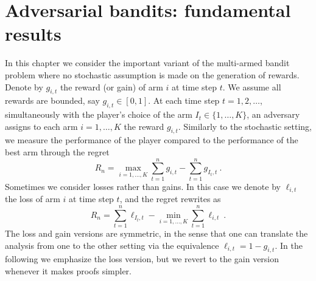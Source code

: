 \documentclass[11pt]{hackednow}
\begin{document}
\chapter{Adversarial bandits: fundamental results}
\label{adversarial}
In this chapter we consider the important variant of the multi-armed bandit problem where no stochastic assumption is made on the generation of rewards. Denote by $g_{i,t}$ the reward (or gain) of arm $i$ at time step $t$. We assume all rewards are bounded, say $g_{i,t}\in [0,1]$. At each time step $t=1, 2,\hdots$, simultaneously with the player's choice of the arm $I_t \in \{1,\hdots,K\}$, an adversary assigns to each arm $i=1,\dots,K$ the reward $g_{i,t}$. Similarly to the stochastic setting, we measure the performance of the player compared to the performance of the best arm through the regret
$$R_n = \max_{i=1,\hdots,K} \sum_{t=1}^n g_{i,t} - \sum_{t=1}^n g_{I_t,t}~.$$
Sometimes we consider losses rather than gains. In this case we denote by $\ell_{i,t}$ the loss of arm $i$ at time step $t$, and the regret rewrites as
$$R_n = \sum_{t=1}^n \ell_{I_t,t} - \min_{i=1,\hdots,K} \sum_{t=1}^n \ell_{i,t}~.$$
The loss and gain versions are symmetric, in the sense that one can translate the analysis from one to the other setting via the equivalence $\ell_{i,t} = 1 - g_{i,t}$. In the following we emphasize the loss version, but we revert to the gain version whenever it makes proofs simpler.
\end{document}
